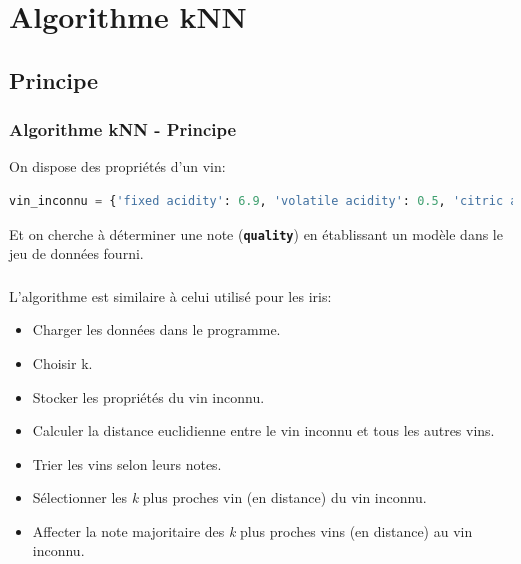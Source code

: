 \documentclass[svgnames,11pt]{beamer}
\begin{document}
\section{Algorithme kNN}
\subsection{Principe}
\begin{frame}[fragile]
    \frametitle{Algorithme kNN - Principe}

    On dispose des propriétés d'un vin:
\begin{center}
\begin{lstlisting}[language=Python , basicstyle=\ttfamily\small, xleftmargin=0.2em, xrightmargin=0em]
vin_inconnu = {'fixed acidity': 6.9, 'volatile acidity': 0.5, 'citric acid': 0.19, 'residual sugar': 3.9, 'chlorides': 0.16, 'free sulfur dioxide': 31.0, 'total sulfur dioxide': 50.0, 'density': 0.994, 'pH': 3.01, 'sulphates': 0.61, 'alcohol': 9.3}
\end{lstlisting}
\end{center}
Et on cherche à déterminer une note (\textbf{\texttt{quality}}) en établissant un modèle dans le jeu de données fourni.
\end{frame}
\begin{frame}
    \frametitle{}

L'algorithme est similaire à celui utilisé pour les iris:
\begin{itemize}
    \item Charger les données dans le programme.
    \item Choisir k.
    \item Stocker les propriétés du vin inconnu.
    \item Calculer la distance euclidienne entre le vin inconnu et tous les autres vins.
    \item Trier les vins selon leurs notes.
    \item Sélectionner les \emph{k} plus proches vin (en distance) du vin inconnu.
    \item Affecter la note majoritaire des \emph{k} plus proches vins (en distance) au vin inconnu.
\end{itemize}

\end{frame}
\end{document}

